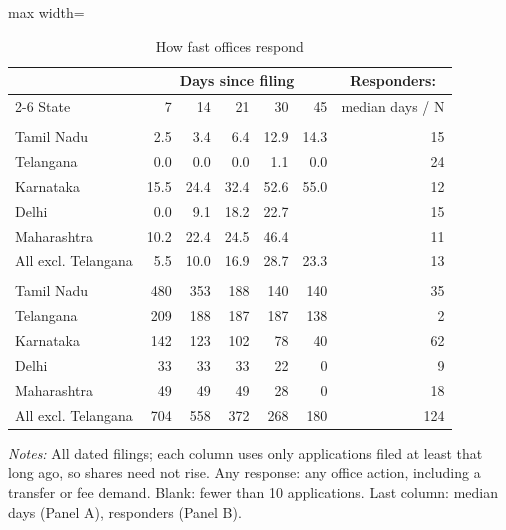 \begin{table}[!htbp]
\centering
\caption{How fast offices respond}
\label{tab:tab_speed}
\small
\begin{adjustbox}{max width=\textwidth}
\begin{threeparttable}
\begin{tabular}{lrrrrrr}
\toprule
& \multicolumn{5}{c}{Days since filing} & \multicolumn{1}{c}{Responders:} \\ \cmidrule(lr){2-6} State & 7 & 14 & 21 & 30 & 45 & median days / N \\
\midrule
\addlinespace\multicolumn{7}{l}{\textit{Panel A. Any response by this day (\%)}} \\
Tamil Nadu & 2.5 & 3.4 & 6.4 & 12.9 & 14.3 & 15 \\
Telangana & 0.0 & 0.0 & 0.0 & 1.1 & 0.0 & 24 \\
Karnataka & 15.5 & 24.4 & 32.4 & 52.6 & 55.0 & 12 \\
Delhi & 0.0 & 9.1 & 18.2 & 22.7 &  & 15 \\
Maharashtra & 10.2 & 22.4 & 24.5 & 46.4 &  & 11 \\
All excl. Telangana & 5.5 & 10.0 & 16.9 & 28.7 & 23.3 & 13 \\
\addlinespace\multicolumn{7}{l}{\textit{Panel B. Applications exposed at least this long (N)}} \\
Tamil Nadu & 480 & 353 & 188 & 140 & 140 & 35 \\
Telangana & 209 & 188 & 187 & 187 & 138 & 2 \\
Karnataka & 142 & 123 & 102 & 78 & 40 & 62 \\
Delhi & 33 & 33 & 33 & 22 & 0 & 9 \\
Maharashtra & 49 & 49 & 49 & 28 & 0 & 18 \\
All excl. Telangana & 704 & 558 & 372 & 268 & 180 & 124 \\
\bottomrule
\end{tabular}
\begin{tablenotes}[flushleft]\footnotesize
\item \textit{Notes:} All dated filings; each column uses only applications filed at least that long ago, so shares need not rise. Any response: any office action, including a transfer or fee demand. Blank: fewer than 10 applications. Last column: median days (Panel A), responders (Panel B).
\end{tablenotes}
\end{threeparttable}
\end{adjustbox}
\end{table}
